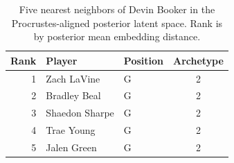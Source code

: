 \begin{table}[htbp]
  \centering\small
  \begin{tabular}{rllc}
    \toprule
    Rank & Player & Position & Archetype \\
    \midrule
    1 & Zach LaVine & G & 2 \\
    2 & Bradley Beal & G & 2 \\
    3 & Shaedon Sharpe & G & 2 \\
    4 & Trae Young & G & 2 \\
    5 & Jalen Green & G & 2 \\
    \bottomrule
  \end{tabular}
  \caption{Five nearest neighbors of Devin Booker in the Procrustes-aligned posterior latent space. Rank is by posterior mean embedding distance.}
  \label{tab:Devin_Booker_neighbors}
\end{table}

